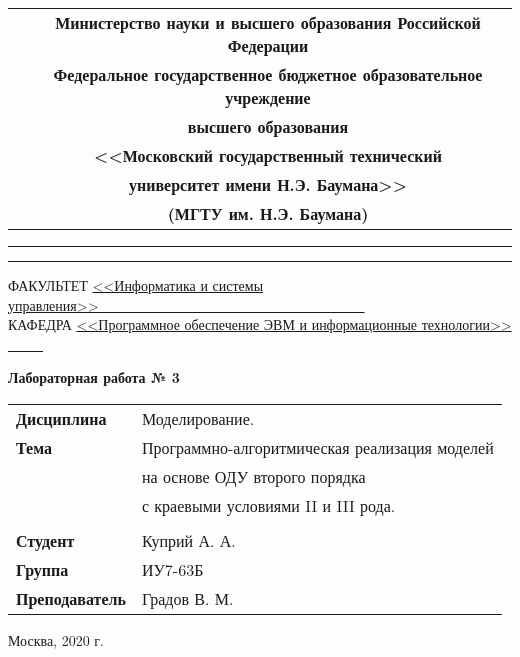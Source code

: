 \pagestyle{empty}
    \begin{table}[H]
        \centering
        \footnotesize
        \begin{tabular}{cc}
            & \textbf{Министерство науки и высшего образования Российской Федерации} \\
            & \textbf{Федеральное государственное бюджетное образовательное учреждение} \\
            & \textbf{высшего образования} \\
            & \textbf{<<Московский государственный технический} \\
            & \textbf{университет имени Н.Э. Баумана>>} \\
            & \textbf{(МГТУ им. Н.Э. Баумана)} \\
        \end{tabular}
    \end{table}

    \vspace{-2.5cm}

    \begin{flushleft}
        \rule[-1cm]{\textwidth}{3pt}
        \rule{\textwidth}{1pt}
    \end{flushleft}

    \begin{flushleft}
        \small
        ФАКУЛЬТЕТ
        \underline{<<Информатика и системы управления>>\ \ \ \ \ \ \ 
        \ \ \ \ \ \ \ \ \ \ \ \ \ \ \ \ \ \ \ \ \ \ \ \ \ \ \ \ \ \ \  } \\
        КАФЕДРА
        \underline{<<Программное обеспечение ЭВМ и
        информационные технологии>>
        \ \ \ \ \ }
    \end{flushleft}

    \vspace{1cm}

    \begin{center}
        \textbf{Лабораторная работа № 3} \\
        \vspace{0.5cm}
    \end{center}

    \vspace{4cm}

    \begin{flushleft}
        \begin{tabular}{ll}
            \textbf{Дисциплина} & Моделирование. \\
            \textbf{Тема} & Программно-алгоритмическая реализация моделей \\
                          & на основе ОДУ второго порядка \\
                          & с краевыми условиями II и  III рода. \\
            \\
            \textbf{Студент} & Куприй А. А. \\
            \textbf{Группа} & ИУ7-63Б \\
            \textbf{Преподаватель} & Градов В. М. \\
        \end{tabular}
    \end{flushleft}

    \vspace{5cm}

    \begin{center}
        Москва, 2020 г.
    \end{center}
